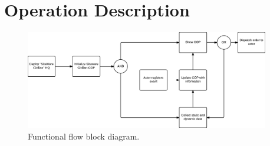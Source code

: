\section{Operation Description}


\begin{figure}[H]
\centering
\includegraphics[width=0.95\textwidth]
{billeder/functional_flow_block_diagram.pdf}
\caption{Functional flow block diagram.}
\label{fig:functional_flow_block_diagram}
\end{figure}